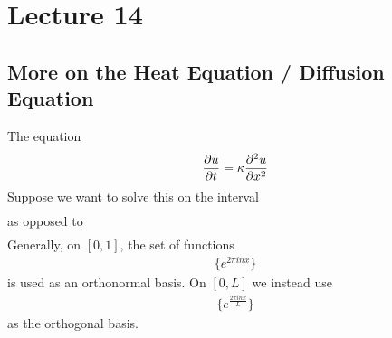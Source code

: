 \section{Lecture 14}
\subsection{More on the Heat Equation / Diffusion Equation}
The equation
\begin{align}
    \pdv{u}{t} = \kappa \pdv[2]{u}{x}
\end{align}
Suppose we want to solve this on the interval
\begin{align}
    [0, L]
\end{align}
as opposed to
\begin{align}
    [0, 1]
\end{align}
Generally, on $[0, 1]$, the set of functions
\begin{align}
    \{ e^{2\pi in x} \}
\end{align}
is used as an orthonormal basis. On $[0, L]$ we instead use
\begin{align}
    \{ e^{\frac{2\pi in x}{L}} \}
\end{align}
as the orthogonal basis.
